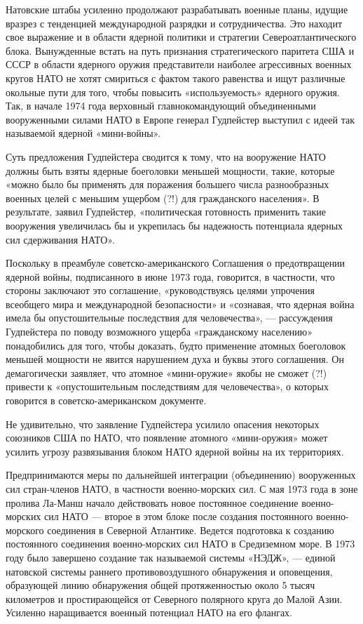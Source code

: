 \documentclass[12pt, a4paper, openany]{book}
\begin{document}
	Натовские штабы усиленно продолжают разрабатывать военные планы, идущие вразрез с тенденцией международной разрядки и сотрудничества. Это находит свое выражение и в области ядерной политики и стратегии Североатлантического блока. Вынужденные встать на путь признания стратегического паритета США и СССР в области ядерного оружия представители наиболее агрессивных военных кругов НАТО не хотят смириться с фактом такого равенства и ищут различные окольные пути для того, чтобы повысить «используемость» ядерного оружия. Так, в начале 1974 года верховный главнокомандующий объединенными вооруженными силами НАТО в Европе генерал Гудпейстер выступил с идеей так называемой ядерной «мини-войны».
	
	Суть предложения Гудпейстера сводится к тому, что на вооружение НАТО должны быть взяты ядерные боеголовки меньшей мощности, такие, которые «можно было бы применять для поражения большего числа разнообразных военных целей с меньшим ущербом (?!) для гражданского населения». В результате, заявил Гудпейстер, «политическая готовность применить такие вооружения увеличилась бы и укрепилась бы надежность потенциала ядерных сил сдерживания НАТО».
	
	Поскольку в преамбуле советско-американского Соглашения о предотвращении ядерной войны, подписанного в июне 1973 года, говорится, в частности, что стороны заключают это соглашение, «руководствуясь целями упрочения всеобщего мира и международной безопасности» и «сознавая, что ядерная война имела бы опустошительные последствия для человечества», — рассуждения Гудпейстера по поводу возможного ущерба «гражданскому населению» понадобились для того, чтобы доказать, будто применение атомных боеголовок меньшей мощности не явится нарушением духа и буквы этого соглашения. Он демагогически заявляет, что атомное «мини-оружие» якобы не сможет (?!) привести к «опустошительным последствиям для человечества», о которых говорится в советско-американском документе.
	
	Не удивительно, что заявление Гудпейстера усилило опасения некоторых союзников США по НАТО, что появление атомного «мини-оружия» может усилить угрозу развязывания блоком НАТО ядерной войны на их территориях.
	
	Предпринимаются меры по дальнейшей интеграции (объединению) вооруженных сил стран-членов НАТО, в частности военно-морских сил. С мая 1973 года в зоне пролива Ла-Манш начало действовать новое постоянное соединение военно-морских сил НАТО — второе в этом блоке после создания постоянного военно-морского соединения в Северной Атлантике. Ведется подготовка к созданию постоянного соединения военно-морских сил НАТО в Средиземном море. В 1973 году было завершено создание так называемой системы «НЭДЖ», — единой натовской системы раннего противовоздушного обнаружения и оповещения, образующей линию обнаружения общей протяженностью около 5 тысяч километров и простирающейся от Северного полярного круга до Малой Азии. Усиленно наращивается военный потенциал НАТО на его флангах.
	
\end{document}
